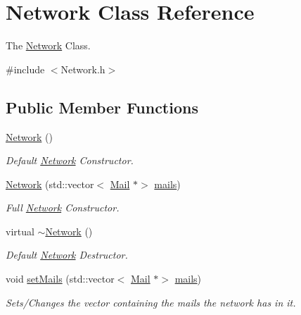 \hypertarget{classNetwork}{}\section{Network Class Reference}
\label{classNetwork}


The \mbox{\hyperlink{classNetwork}{Network}} Class.  




{\ttfamily \#include $<$Network.\+h$>$}

\subsection*{Public Member Functions}
\begin{DoxyCompactItemize}
\item 
\mbox{\hyperlink{classNetwork_a3cc2fb4f8fa4d507077e8da85ce5a1c8}{Network}} ()
\begin{DoxyCompactList}\small\item\em Default \mbox{\hyperlink{classNetwork}{Network}} Constructor. \end{DoxyCompactList}\item 
\mbox{\hyperlink{classNetwork_a6c20a000b0a40b33b39b26874a4d50dd}{Network}} (std\+::vector$<$ \mbox{\hyperlink{classMail}{Mail}} $\ast$$>$ \mbox{\hyperlink{classNetwork_a7d870918668129e7853c5374785955b1}{mails}})
\begin{DoxyCompactList}\small\item\em Full \mbox{\hyperlink{classNetwork}{Network}} Constructor. \end{DoxyCompactList}\item 
virtual \mbox{\hyperlink{classNetwork_a7a4e19cdb4bf0c7ecf82baa643831492}{$\sim$\+Network}} ()
\begin{DoxyCompactList}\small\item\em Default \mbox{\hyperlink{classNetwork}{Network}} Destructor. \end{DoxyCompactList}\item 
void \mbox{\hyperlink{classNetwork_a2dfe751f83ea0ed37835baf23770d1b6}{set\+Mails}} (std\+::vector$<$ \mbox{\hyperlink{classMail}{Mail}} $\ast$$>$ \mbox{\hyperlink{classNetwork_a7d870918668129e7853c5374785955b1}{mails}})
\begin{DoxyCompactList}\small\item\em Sets/\+Changes the vector containing the mails the network has in it. \end{DoxyCompactList}\item 

\end{DoxyCompactItemize}

